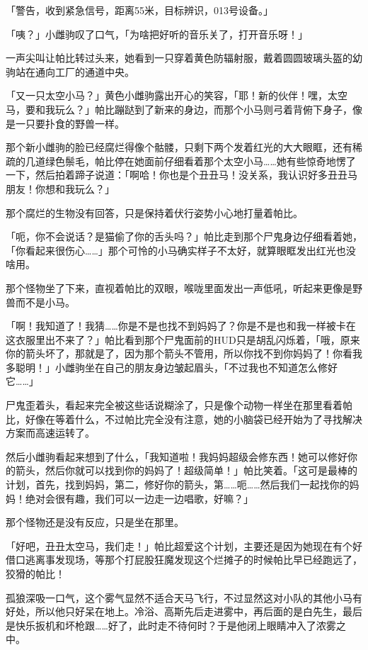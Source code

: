 「警告，收到紧急信号，距离55米，目标辨识，013号设备。」

「咦？」小雌驹叹了口气，「为啥把好听的音乐关了，打开音乐呀！」

一声尖叫让帕比转过头来，她看到一只穿着黄色防辐射服，戴着圆圆玻璃头盔的幼驹站在通向工厂的通道中央。

「又一只太空小马？」黄色小雌驹露出开心的笑容，「耶！新的伙伴！嘿，太空马，要和我玩么？」帕比蹦跶到了新来的身边，而那个小马则弓着背俯下身子，像是一只要扑食的野兽一样。

那个新小雌驹的脸已经腐烂得像个骷髅，只剩下两个发着红光的大大眼眶，还有稀疏的几道绿色鬃毛，帕比停在她面前仔细看着那个太空小马……她有些惊奇地愣了一下，然后拍着蹄子说道：「啊哈！你也是个丑丑马！没关系，我认识好多丑丑马朋友！你想和我玩么？」

那个腐烂的生物没有回答，只是保持着伏行姿势小心地打量着帕比。

「呃，你不会说话？是猫偷了你的舌头吗？」帕比走到那个尸鬼身边仔细看着她，「你看起来很伤心……」那个可怜的小马确实样子不太好，就算眼眶发出红光也没啥用。

那个怪物坐了下来，直视着帕比的双眼，喉咙里面发出一声低吼，听起来更像是野兽而不是小马。

「啊！我知道了！我猜……你是不是也找不到妈妈了？你是不是也和我一样被卡在这衣服里出不来了？」帕比看到那个尸鬼面前的HUD只是胡乱闪烁着，「哦，原来你的箭头坏了，那就是了，因为那个箭头不管用，所以你找不到你妈妈了！你看我多聪明！」小雌驹坐在自己的朋友身边皱起眉头，「不过我也不知道怎么修好它……」

尸鬼歪着头，看起来完全被这些话说糊涂了，只是像个动物一样坐在那里看着帕比，好像在等着什么，不过帕比完全没有注意，她的小脑袋已经开始为了寻找解决方案而高速运转了。

然后小雌驹看起来想到了什么，「我知道啦！我妈妈超级会修东西！她可以修好你的箭头，然后你就可以找到你的妈妈了！超级简单！」帕比笑着。「这可是最棒的计划，首先，找到妈妈，第二，修好你的箭头，第……呃……然后我们一起找你的妈妈！绝对会很有趣，我们可以一边走一边唱歌，好嘛？」

那个怪物还是没有反应，只是坐在那里。

「好吧，丑丑太空马，我们走！」帕比超爱这个计划，主要还是因为她现在有个好借口逃离事发现场，等那个打屁股狂魔发现这个烂摊子的时候帕比早已经跑远了，狡猾的帕比！

\horizonline


孤狼深吸一口气，这个雾气显然不适合天马飞行，不过显然这对小队的其他小马有好处，所以他只好呆在地上。冷浴、高斯先后走进雾中，再后面的是白先生，最后是快乐扳机和坏枪跟……好了，此时走不待何时？于是他闭上眼睛冲入了浓雾之中。

